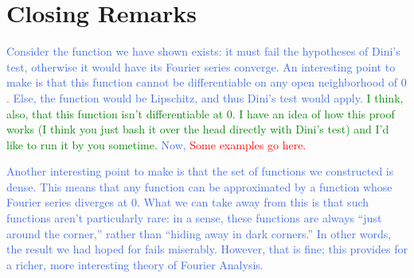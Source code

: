 \documentclass{amsart}
\newcommand{\colorcomment}[2]{\textcolor{#1}{#2}} %
\theoremstyle{definition}
\begin{document}
\section{Closing Remarks}

\colorcomment{RoyalBlue}{Consider the function we have shown exists: it must fail the hypotheses of Dini's test, otherwise it would have its Fourier series converge. 
An interesting point to make is that this function cannot be differentiable on any open neighborhood of $0$. 
Else, the function would be Lipschitz, and thus Dini's test would apply. 
\colorcomment{Green}{I think, also, that this function isn't differentiable at $0$. I have an idea of how this proof works (I think you just bash it over the head directly with Dini's test) and I'd like to run it by you sometime.}
Now, \colorcomment{red}{Some examples go here.}}

\colorcomment{RoyalBlue}{Another interesting point to make is that the set of functions we constructed is dense. 
This means that any function can be approximated by a function whose Fourier series diverges at $0$. 
What we can take away from this is that such functions aren't particularly rare: in a sense, these functions are always ``just around the corner,'' rather than ``hiding away in dark corners.''
In other words, the result we had hoped for fails miserably. 
However, that is fine; this provides for a richer, more interesting theory of Fourier Analysis.}
\end{document}
